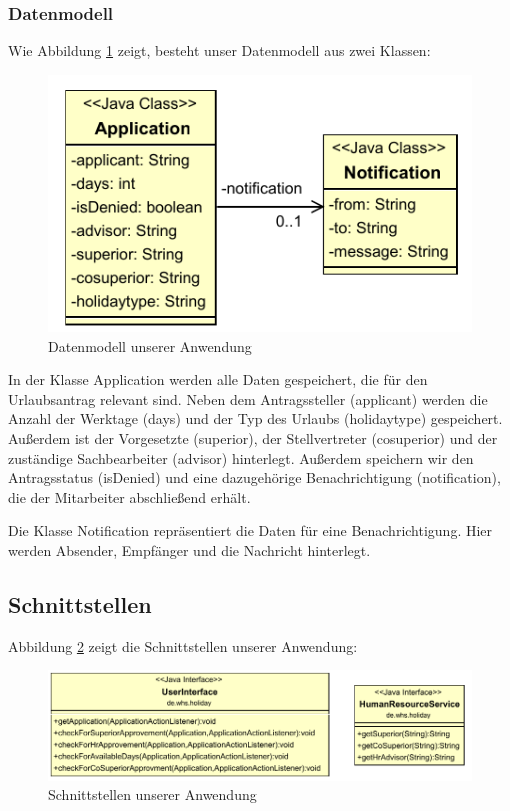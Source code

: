 \subsubsection{Datenmodell}
Wie Abbildung \ref{fig:Datenmodell} zeigt, besteht unser Datenmodell aus zwei Klassen:

\begin{figure}[H]
\centering
\includegraphics[width=0.5\linewidth]{Bilder/Datenmodell}
\caption{Datenmodell unserer Anwendung}
\label{fig:Datenmodell}
\end{figure}

In der Klasse Application werden alle Daten gespeichert, die für den Urlaubsantrag relevant sind. Neben dem Antragssteller (applicant) werden die Anzahl der Werktage (days) und der Typ des Urlaubs (holidaytype) gespeichert. Außerdem ist der Vorgesetzte (superior), der Stellvertreter (cosuperior) und der zuständige Sachbearbeiter (advisor) hinterlegt. Außerdem speichern wir den Antragsstatus (isDenied) und eine dazugehörige Benachrichtigung (notification), die der Mitarbeiter abschließend erhält.

Die Klasse Notification repräsentiert die Daten für eine Benachrichtigung. Hier werden Absender, Empfänger und die Nachricht hinterlegt. 

\subsection{Schnittstellen}
Abbildung \ref{fig:Schnittstellen} zeigt die Schnittstellen unserer Anwendung:

\begin{figure}[H]
\centering
\includegraphics[width=1.0\linewidth]{Bilder/Schnittstellen}
\caption{Schnittstellen unserer Anwendung}
\label{fig:Schnittstellen}
\end{figure}

